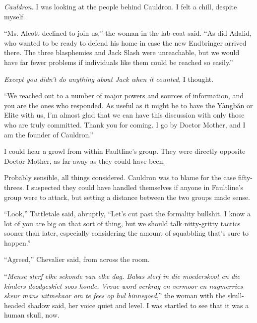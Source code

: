 \emph{Cauldron}.  I was looking at the people behind Cauldron.  I felt a chill, despite myself.



``Ms. Alcott declined to join us,'' the woman in the lab coat said.  ``As did Adalid, who wanted to be ready to defend his home in case the new Endbringer arrived there.  The three blasphemies and Jack Slash were unreachable, but we would have far fewer problems if individuals like them could be reached so easily.''



\emph{Except you didn't do anything about Jack when it counted}, I thought.



``We reached out to a number of major powers and sources of information, and you are the ones who responded.  As useful as it might be to have the Y\`{a}ngb\v{a}n or Elite with us, I'm almost glad that we can have this discussion with only those who are truly committed.  Thank you for coming.  I go by Doctor Mother, and I am the founder of Cauldron.''



I could hear a growl from within Faultline's group.  They were directly opposite Doctor Mother, as far away as they could have been.



Probably sensible, all things considered.  Cauldron was to blame for the case fifty-threes.  I suspected they could have handled themselves if anyone in Faultline's group were to attack, but setting a distance between the two groups made sense.



``Look,'' Tattletale said, abruptly, ``Let's cut past the formality bullshit.  I know a lot of you are big on that sort of thing, but we should talk nitty-gritty tactics sooner than later, especially considering the amount of squabbling that's sure to happen.''



``Agreed,'' Chevalier said, from across the room.



``\emph{Mense sterf elke sekonde van elke dag. Babas sterf in die moederskoot en die kinders doodgeskiet soos honde. Vroue word verkrag en vermoor en nagmerries skeur mans uitmekaar om te fees op hul binnegoed},'' the woman with the skull-headed shadow said, her voice quiet and level.  I was startled to see that it was a human skull, now.



